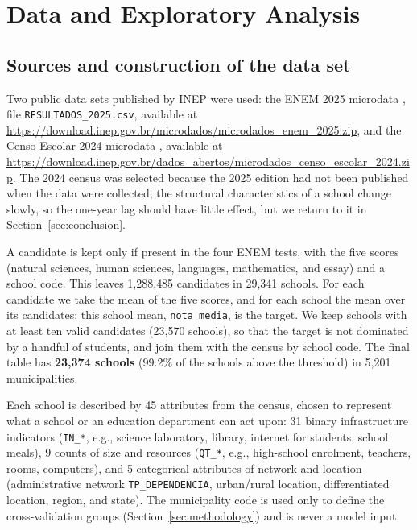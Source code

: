 \section{Data and Exploratory Analysis}
\label{sec:data}

\subsection{Sources and construction of the data set}

Two public data sets published by INEP were used: the ENEM 2025 microdata
\cite{inep2025enem}, file \texttt{RESULTADOS\_2025.csv}, available at
\url{https://download.inep.gov.br/microdados/microdados_enem_2025.zip}, and the Censo Escolar
2024 microdata \cite{inep2024censo}, available at
\url{https://download.inep.gov.br/dados_abertos/microdados_censo_escolar_2024.zip}. The 2024
census was selected because the 2025 edition had not been published when the data were collected; the
structural characteristics of a school change slowly, so the one-year lag should have little
effect, but we return to it in Section~\ref{sec:conclusion}.

A candidate is kept only if present in the four ENEM tests, with the five scores (natural
sciences, human sciences, languages, mathematics, and essay) and a school code. This leaves
1{,}288{,}485 candidates in 29{,}341 schools. For each candidate we take the mean of the five
scores, and for each school the mean over its candidates; this school mean, \texttt{nota\_media},
is the target. We keep schools with at least ten valid candidates (23{,}570 schools), so that the
target is not dominated by a handful of students, and join them with the census by school code.
The final table has \textbf{23{,}374 schools} (99.2\% of the schools above the threshold) in
5{,}201 municipalities.

Each school is described by 45 attributes from the census, chosen to represent what a school or
an education department can act upon: 31 binary infrastructure indicators (\texttt{IN\_*}, e.g.,
science laboratory, library, internet for students, school meals), 9 counts of size and resources
(\texttt{QT\_*}, e.g., high-school enrolment, teachers, rooms, computers), and 5 categorical
attributes of network and location (administrative network \texttt{TP\_DEPENDENCIA}, urban/rural
location, differentiated location, region, and state). The municipality code is used only to
define the cross-validation groups (Section~\ref{sec:methodology}) and is never a model input.


